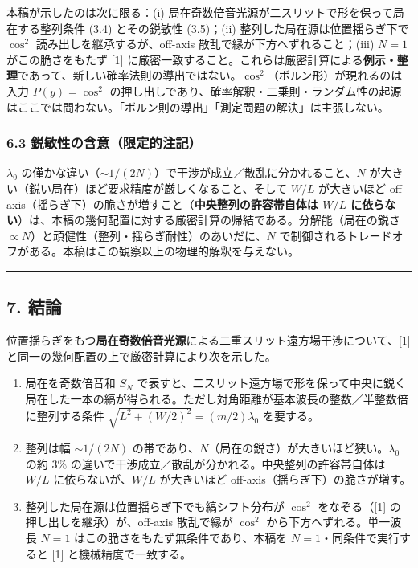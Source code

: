 \documentclass[
]{ltjsarticle}
\providecommand{\tightlist}{%
  \setlength{\itemsep}{0pt}\setlength{\parskip}{0pt}}
\begin{document}
本稿が示したのは次に限る：(i)
局在奇数倍音光源が二スリットで形を保って局在する整列条件 (3.4)
とその鋭敏性 (3.5)；(ii) 整列した局在源は位置揺らぎ下で \(\cos^2\)
読み出しを継承するが、off-axis 散乱で縁が下方へずれること；(iii) \(N=1\)
がこの脆さをもたず {[}1{]}
に厳密一致すること。これらは厳密計算による\textbf{例示・整理}であって、新しい確率法則の導出ではない。\(\cos^2\)（ボルン形）が現れるのは入力
\(P(y)=\cos^2\)
の押し出しであり、確率解釈・二乗則・ランダム性の起源はここでは問わない。「ボルン則の導出」「測定問題の解決」は主張しない。

\subsubsection{6.3
鋭敏性の含意（限定的注記）}\label{ux92edux654fux6027ux306eux542bux610fux9650ux5b9aux7684ux6ce8ux8a18}

\(\lambda_0\)
の僅かな違い（\(\sim 1/(2N)\)）で干渉が成立／散乱に分かれること、\(N\)
が大きい（鋭い局在）ほど要求精度が厳しくなること、そして \(W/L\)
が大きいほど
off-axis（揺らぎ下）の脆さが増すこと（\textbf{中央整列の許容帯自体は
\(W/L\)
に依らない}）は、本稿の幾何配置に対する厳密計算の帰結である。分解能（局在の鋭さ
\(\propto N\)）と頑健性（整列・揺らぎ耐性）のあいだに、\(N\)
で制御されるトレードオフがある。本稿はこの観察以上の物理的解釈を与えない。

\begin{center}\rule{0.5\linewidth}{0.5pt}\end{center}

\subsection{7. 結論}\label{ux7d50ux8ad6}

位置揺らぎをもつ\textbf{局在奇数倍音光源}による二重スリット遠方場干渉について、{[}1{]}
と同一の幾何配置の上で厳密計算により次を示した。

\begin{enumerate}
\def\labelenumi{\arabic{enumi}.}
\tightlist
\item
  局在を奇数倍音和 \(S_N\)
  で表すと、二スリット遠方場で形を保って中央に鋭く局在した一本の縞が得られる。ただし対角距離が基本波長の整数／半整数倍に整列する条件
  \(\sqrt{L^2+(W/2)^2}=(m/2)\lambda_0\) を要する。
\item
  整列は幅 \(\sim1/(2N)\)
  の帯であり、\(N\)（局在の鋭さ）が大きいほど狭い。\(\lambda_0\) の約
  \(3\%\) の違いで干渉成立／散乱が分かれる。中央整列の許容帯自体は
  \(W/L\) に依らないが、\(W/L\) が大きいほど
  off-axis（揺らぎ下）の脆さが増す。
\item
  整列した局在源は位置揺らぎ下でも縞シフト分布が \(\cos^2\)
  をなぞる（{[}1{]} の押し出しを継承）が、off-axis 散乱で縁が \(\cos^2\)
  から下方へずれる。単一波長 \(N=1\)
  はこの脆さをもたず無条件であり、本稿を \(N=1\)・同条件で実行すると
  {[}1{]} と機械精度で一致する。
\end{enumerate}
\end{document}
